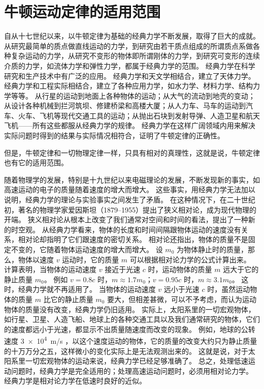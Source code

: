 \section{牛顿运动定律的适用范围}
自从十七世纪以来，以牛顿定律为基础的经典力学不断发展，取得了巨大的成就。
从研究最简单的质点做直线运动的力学，到研究由若干质点组成的所谓质点系做各种复杂运动的力学，从研究不变形的物体即所谓刚体的力学，到研究可变形的连续介质的力学，如流体力学和弹性力学，都属于经典力学的范围。
经典力学在科学研究和生产技术中有广泛的应用。
经典力学和天文学相结合，建立了天体力学。
经典力学和工程实际相结合，建立了各种应用力学，如水力学、材料力学、结构力学等等。
从行星的运动到地面上各种物体的运动；从大气的流动到地壳的变动；从设计各种机械到拦河筑坝、修建桥梁和高楼大厦；从人力车、马车的运动到汽车、火车、飞机等现代交通工具的运动；从抛出石块到发射导弹、人造卫星和航天飞机——所有这些都服从经典力学的规律。
经典力学在这样广阔领域内用来解决实际问题时得到的结果与实际情况相符合，证明了牛顿定律的正确性。

但是，牛顿定律和一切物理定律一样，只具有相对的真理性，这就是说，牛顿定律也有它的适用范围。

随着物理学的发展，特别是十九世纪以来电磁理论的发展，不断发现新的事实，如高速运动的电子的质量随着速度的增大而增大。
这些事实，用经典力学无法加以说明，经典力学的理论与实验事实之间发生了矛盾。
在这种情况下，在二十世纪初，著名的物理学家爱因斯坦（1879--1955）提出了狭义相对论，成为现代物理的开端。
狭义相对论从根本上改变了我们通常对空间和时间的看法，提出了一种新的时空观。
从经典力学看来，物体的长度和时间间隔跟物体运动的速度没有关系，相对论却指明了它们跟速度的密切关系。
相对论还指出，物体的质量不是固定不变的，它随着物体运动速度的增大而增大。
设 $m_0$ 为物体静止时的质量，那么，物体以速度 $v$ 运动时，它的质量 $m$ 可以根据相对论力学的公式计算出来。
计算表明，当物体的运动速度 $v$ 接近于光速 $c$ 时，运动物体的质量 $m$ 远大于它的静止质量 $m_0$。
例如 $v=0.8c$ 时，$m\approx 1.7m_0$；$v=0.95c$ 时，$m\approx 3.1m_0$。
这时，经典力学就不再适用了。
当物体的运动速度 $v$ 远小于光速 $c$ 时，虽然运动物体的质量 $m$ 比它的静止质量 $m_0$ 要大，但相差甚微，可以不予考虑，而认为运动物体的质量没有改变，经典力学仍旧适用。
实际上，太阳系里的一切宏观物体，如行星、卫星、人造飞船、地球上的各种交通工具以及我们通常研究的物体，它们的速度都远小于光速，都显示不出质量随速度而改变的现象。
例如，地球的公转速度 \qty{3e4}{m/s} ，以这个速度运动的物体，它的质量的改变大约只为静止质量的十万万分之五，这样微小的变化实际上是无法观测出来的。
这就是说，对于太阳系里一切宏观物体的运动来说，经典力学已经足够准确了。
总之，处理低速运动问题时，经典力学是完全适用的；处理高速运动问题时，必须用相对论力学。
经典力学是相对论力学在低速时良好的近似。

